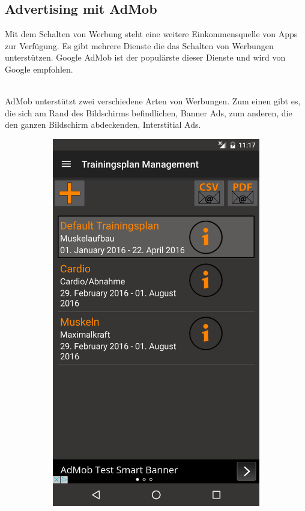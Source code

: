 \documentclass[FIPLY_base.tex]{subfiles}
\begin{document}
\subsection{Advertising mit AdMob}
Mit dem Schalten von Werbung steht eine weitere Einkommensquelle von Apps zur Verfügung.
Es gibt mehrere Dienste die das Schalten von Werbungen unterstützen.
Google AdMob ist der populärste dieser Dienste und wird von Google empfohlen.

\ \\
AdMob unterstützt zwei verschiedene Arten von Werbungen. 
Zum einen gibt es, die sich am Rand des Bildschirms befindlichen, Banner Ads, zum anderen, die den ganzen Bildschirm abdeckenden, Interstitial Ads. 
\ \\
\begin{figure}[h]
	\begin{subfigure}[b]{0.3\textwidth}
	\includegraphics[scale=0.15]{img/adsBanner}

\end{subfigure}
\end{figure}
\end{document}
